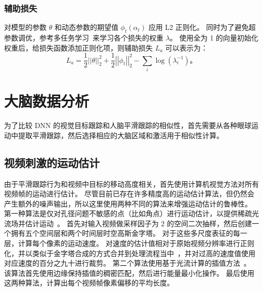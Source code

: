 
\subsubsection{辅助损失}
对模型的参数 $\theta$ 和动态参数的期望值 $\phi_t(\alpha_t)$ 应用 L2 正则化。
同时为了避免超参数调优，参考多任务学习~\cite{multitask}来学习各个损失的权重 $\lambda$。
使用全为 1 的向量初始化权重后，给损失函数添加正则化项，则辅助损失 $L_a$ 可以表示为：
\begin{equation}
L_a = 
\frac{1}{2} \left\vert \left\vert \theta \right\vert \right\vert _2 ^2 + 
\frac{1}{2} \left\vert \left\vert \phi_t \right\vert \right\vert _2 ^2
- \sum_{i} \log (\lambda_i^{-1})\mbox{。}
\end{equation}




\section{大脑数据分析}
为了比较 DNN 的视觉目标跟踪和人脑平滑跟踪的相似性，首先需要从各种眼球运动中提取平滑跟踪，然后选择相应的大脑区域和激活用于相似性计算。

\subsection{视频刺激的运动估计}
由于平滑跟踪行为和视频中目标的移动高度相关，首先使用计算机视觉方法对所有视频帧的运动进行估计。
尽管目前已存在许多精度高的运动估计算法，但仍然会产生额外的噪声输出，所以这里使用两种不同的算法来增强运动估计的鲁棒性。
第一种算法是仅对孔径问题不敏感的点（比如角点）进行运动估计，以提供稀疏光流场并估计运动~\cite{structure_tensor}。
首先对输入视频做采样因子为 2 的空间二次抽样，然后创建一个拥有五个空间层和两个时间层时空高斯金字塔。
对于这些多尺度表征的每一层，计算每个像素的运动速度。
对速度的估计值相对于原始视频分辨率进行正则化，并以类似于金字塔合成的方式合并到处理流程当中~\cite{pyramid_synthesis}，并对过高的速度值使用对应速度的百分之九十进行裁剪。
第二个算法使用基于光流计算的插值方法~\cite{epicflow}。
该算法首先使用边缘保持插值的稠密匹配，然后进行能量最小化操作。
最后使用这两种算法，计算出每个视频帧像素偏移的平均长度。


